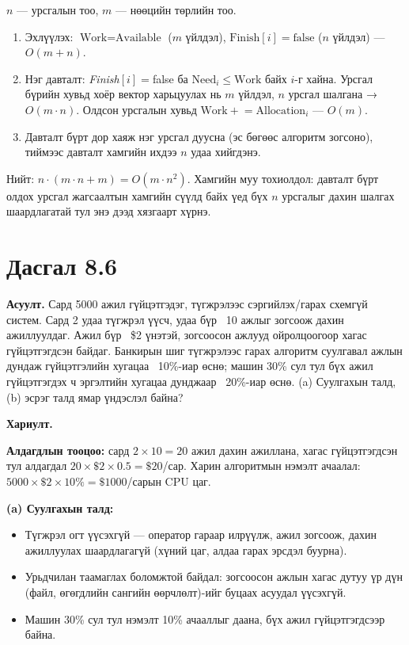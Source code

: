 \documentclass[12pt,a4paper]{article}
\newcommand{\question}[2]{\section{Дасгал #1}\textbf{Асуулт.} #2\par\medskip\textbf{Хариулт.}\par}
\begin{document}
$n$ — урсгалын тоо, $m$ — нөөцийн төрлийн тоо.
\begin{enumerate}[leftmargin=1.5em]
  \item Эхлүүлэх: $\text{Work} = \text{Available}$ ($m$ үйлдэл), $\text{Finish}[i] = \text{false}$ ($n$ үйлдэл) — $O(m+n)$.
  \item Нэг давталт: \textit{Finish}$[i]=$false ба $\text{Need}_i \le \text{Work}$ байх $i$-г хайна. Урсгал бүрийн хувьд хоёр вектор харьцуулах нь $m$ үйлдэл, $n$ урсгал шалгана → $O(m \cdot n)$. Олдсон урсгалын хувьд $\text{Work} \mathrel{+}= \text{Allocation}_i$ — $O(m)$.
  \item Давталт бүрт дор хаяж нэг урсгал дуусна (эс бөгөөс алгоритм зогсоно), тиймээс давталт хамгийн ихдээ $n$ удаа хийгдэнэ.
\end{enumerate}
Нийт: $n \cdot (m \cdot n + m) = O(m \cdot n^2)$. Хамгийн муу тохиолдол: давталт бүрт олдох урсгал жагсаалтын хамгийн сүүлд байх үед бүх $n$ урсгалыг дахин шалгах шаардлагатай тул энэ дээд хязгаарт хүрнэ.

\question{8.6}{Сард 5000 ажил гүйцэтгэдэг, түгжрэлээс сэргийлэх/гарах схемгүй систем. Сард 2 удаа түгжрэл үүсч, удаа бүр ~10 ажлыг зогсоож дахин ажиллуулдаг. Ажил бүр ~\$2 үнэтэй, зогсоосон ажлууд ойролцоогоор хагас гүйцэтгэгдсэн байдаг. Банкирын шиг түгжрэлээс гарах алгоритм суулгавал ажлын дундаж гүйцэтгэлийн хугацаа ~10\%-иар өснө; машин 30\% сул тул бүх ажил гүйцэтгэгдэх ч эргэлтийн хугацаа дунджаар ~20\%-иар өснө. (a) Суулгахын талд, (b) эсрэг талд ямар үндэслэл байна?}

\textbf{Алдагдлын тооцоо:} сард $2 \times 10 = 20$ ажил дахин ажиллана, хагас гүйцэтгэгдсэн тул алдагдал $20 \times \$2 \times 0.5 = \$20$/сар. Харин алгоритмын нэмэлт ачаалал: $5000 \times \$2 \times 10\% = \$1000$/сарын CPU цаг.

\textbf{(a) Суулгахын талд:}
\begin{itemize}[leftmargin=1.5em]
  \item Түгжрэл огт үүсэхгүй — оператор гараар илрүүлж, ажил зогсоож, дахин ажиллуулах шаардлагагүй (хүний цаг, алдаа гарах эрсдэл буурна).
  \item Урьдчилан таамаглах боломжтой байдал: зогсоосон ажлын хагас дутуу үр дүн (файл, өгөгдлийн сангийн өөрчлөлт)-ийг буцаах асуудал үүсэхгүй.
  \item Машин 30\% сул тул нэмэлт 10\% ачааллыг даана, бүх ажил гүйцэтгэгдсээр байна.
\end{itemize}
\end{document}
